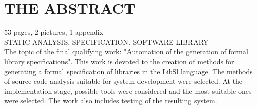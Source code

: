 \chapter*{THE ABSTRACT}
\thispagestyle{empty}

53 pages, 2 pictures, 1 appendix \\

STATIC ANALYSIS, SPECIFICATION, SOFTWARE LIBRARY \\

The topic of the final qualifying work: "Automation of the generation of formal library specifications".
This work is devoted to the creation of methods for generating a formal specification of libraries in the LibSl language.
The methods of source code analysis suitable for system development were selected.
At the implementation stage, possible tools were considered and the most suitable ones were selected.
The work also includes testing of the resulting system.